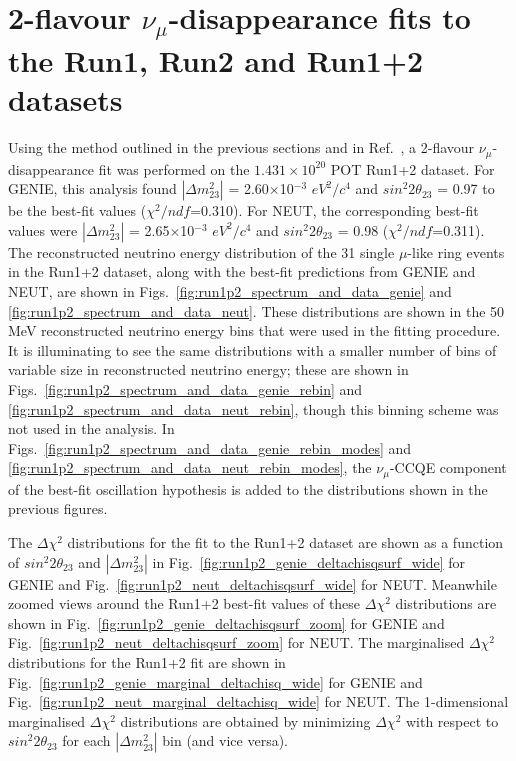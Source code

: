 \clearpage

\section {2-flavour $\nu_{\mu}$-disappearance fits to the Run1, Run2 and Run1+2 datasets}
\label{sec:fits}

Using the method outlined in the previous sections and in Ref.\ \cite{OurRun1DisappAnalysis},
a 2-flavour $\nu_{\mu}$-disappearance fit was performed on the $1.431\times10^{20}$ POT Run1+2 dataset.
For GENIE, this analysis found
$|\Delta m^{2}_{23}|$ = 2.60$\times$10$^{-3}$ $eV^{2}/c^{4}$ and
$sin^{2}2\theta_{23}$ = 0.97 
to be the best-fit values ($\chi^{2}/ndf$=0.310).
For NEUT, the corresponding best-fit values were
$|\Delta m^{2}_{23}|$ = 2.65$\times$10$^{-3}$ $eV^{2}/c^{4}$ and
$sin^{2}2\theta_{23}$ = 0.98 ($\chi^{2}/ndf$=0.311).
The reconstructed neutrino energy distribution of the 31 single $\mu$-like ring events in the Run1+2 dataset, 
along with the best-fit predictions from GENIE and NEUT, are shown in  
Figs.\ \ref{fig:run1p2_spectrum_and_data_genie} and \ref{fig:run1p2_spectrum_and_data_neut}.
These distributions are shown in the 50 MeV reconstructed neutrino energy bins that were used in the fitting procedure.
It is illuminating to see the same distributions with a smaller number of bins of
 variable size in reconstructed neutrino energy; these are shown in 
Figs.\ \ref{fig:run1p2_spectrum_and_data_genie_rebin} and \ref{fig:run1p2_spectrum_and_data_neut_rebin}, 
though this binning scheme was not used in the analysis.
In Figs.\ \ref{fig:run1p2_spectrum_and_data_genie_rebin_modes} and \ref{fig:run1p2_spectrum_and_data_neut_rebin_modes},
the $\nu_{\mu}$-CCQE component of the best-fit oscillation hypothesis is added to the distributions shown in the previous figures.

The $\Delta\chi^{2}$ distributions
for the fit to the Run1+2 dataset are shown as a function of $sin^{2}2\theta_{23}$ and $|\Delta m^{2}_{23}|$ in
Fig.\ \ref{fig:run1p2_genie_deltachisqsurf_wide} for GENIE and
Fig.\ \ref{fig:run1p2_neut_deltachisqsurf_wide} for NEUT.
Meanwhile zoomed views around the Run1+2 best-fit values of these $\Delta\chi^{2}$ distributions are shown in
Fig.\ \ref{fig:run1p2_genie_deltachisqsurf_zoom} for GENIE and
Fig.\ \ref{fig:run1p2_neut_deltachisqsurf_zoom} for NEUT.
The marginalised $\Delta\chi^{2}$ distributions for the Run1+2 fit are shown in
Fig.\ \ref{fig:run1p2_genie_marginal_deltachisq_wide} for GENIE and
Fig.\ \ref{fig:run1p2_neut_marginal_deltachisq_wide} for NEUT.
The 1-dimensional marginalised $\Delta\chi^{2}$ distributions are obtained by minimizing $\Delta\chi^{2}$ with respect to
$sin^{2}2\theta_{23}$ for each $|\Delta m^{2}_{23}|$ bin (and vice versa).

